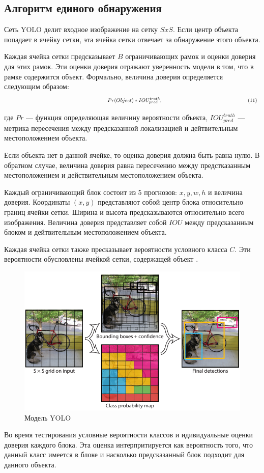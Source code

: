\documentclass[a4paper,english,russian]{G2-105}
\begin{document}
\subsection{Алгоритм единого обнаружения}
\par Сеть YOLO делит входное изображение на сетку $SxS$. Если центр объекта попадает в ячейку сетки, эта ячейка сетки отвечает за обнаружение этого объекта.
\par Каждая ячейка сетки предсказывает $B$ ограничивающих рамок и оценки доверия для этих рамок. Эти оценки доверия отражают уверенность модели в том, что в рамке содержится объект. Формально, величина доверия определяется следующим образом:
\[
\ \hspace*{66mm} Pr(Object)*IOU_{pred}^{truth},  \ \hspace*{56mm} (11)
\]
\par где $Pr$ --- функция определяющая величину вероятности объекта, $IOU_{pred}^{truth}$ --- метрика пересечения между предсказанной локализацией и дейтвительным местоположением объекта.
\par Если объекта нет в данной ячейке, то оценка доверия должна быть равна нулю. В обратном случае, величина доверия равна пересечению между предстказанным местоположением и действительным местоположением объекта.
\par Каждый ограничивающий блок состоит из 5 прогнозов: $x, y, w, h$ и величина доверия. Координаты $(x, y)$ представляют собой центр блока относительно границ ячейки сетки. Ширина и высота предсказываются относительно всего изображения. Величина доверия представляет собой $IOU$ между предсказанным блоком и дейтвительным местоположением объекта.
\par Каждая ячейка сетки также пресказывает вероятности условного класса $C$. Эти вероятности обусловлены ячейкой сетки, содержащей объект \cite{18}.
\begin{figure}
    \includegraphics[width=0.7\linewidth]{yoloiter.png}
    \caption{Модель YOLO}
	\label{yoloiter}
\end{figure} 
\par Во время тестирования условные вероятности классов и идивидуальные оценки доверия каждого блока. Эта оценка интерпритируется как вероятность того, что данный класс имеется в блоке и насколько предсказанный блок подходит для данного объекта. 
\end{document}
